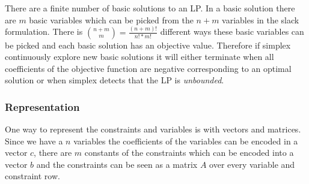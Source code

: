 There are a finite number of basic solutions to an LP. In a basic solution there are $m$ basic variables which can be picked from the $n + m$ variables in the slack formulation. There is ${{n+m}\choose{m}} = \frac{(n+m)!}{n!*m!}$ different ways these basic variables can be picked and each basic solution has an objective value. Therefore if simplex continuously explore new basic solutions it will either terminate when all coefficients of the objective function are negative corresponding to an optimal solution or when simplex detects that the LP is \textit{unbounded}.

\subsubsection{Representation}
One way to represent the constraints and variables is with vectors and matrices. Since we have a $n$ variables the coefficients of the variables can be encoded in a vector $c$, there are $m$ constants of the constraints which can be encoded into a vector $b$ and the constraints can be seen as a matrix $A$ over every variable and constraint row.
